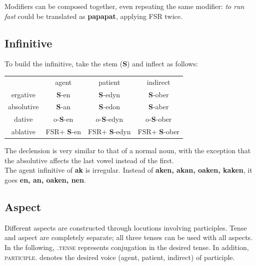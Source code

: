 \documentclass[10pt,oneside]{memoir}
\newcommand{\fsr}{FSR}
\begin{document}
\begin{multicols}{2}
Modifiers can be composed together, even repeating the same modifier: \emph{to run fast} could be translated as \textbf{papapat}, applying FSR twice.

    \subsection{Infinitive}

    To build the infinitive, take the stem (\textbf{S}) and inflect as follows:

    \begin{center}
    \newcommand{\Ss}{\textbf{S}}
    \begin{tabular}[]{c c c c}
         & agent & patient & indirect \\
     ergative & \Ss-en & \Ss-edyn & \Ss-ober \\
     absolutive & \Ss-an  & \Ss-edon & \Ss-aber \\
     dative & o-\Ss-en & o-\Ss-edyn & o-\Ss-ober \\
     ablative & \fsr + \Ss-en & \fsr + \Ss-edyn & \fsr + \Ss-ober\\
    \end{tabular}


\end{center}

    The declension is very similar to that of a normal noun, with the exception that the absolutive affects the last vowel instead of the first.\\The agent infinitive of \textbf{ak} is irregular. Instead of \textbf{aken, akan, oaken, kaken}, it goes \textbf{en, an, oaken, nen}.


    \columnbreak

	\subsection{Aspect}

    Different aspects are constructed through locutions involving participles. Tense and aspect are completely separate; all three tenses can be used with all aspects. In the following, \textsc{.tense} represents conjugation in the desired tense. In addition, \textsc{participle.} denotes the desired voice (agent, patient, indirect) of participle.


\end{multicols}
\end{document}
